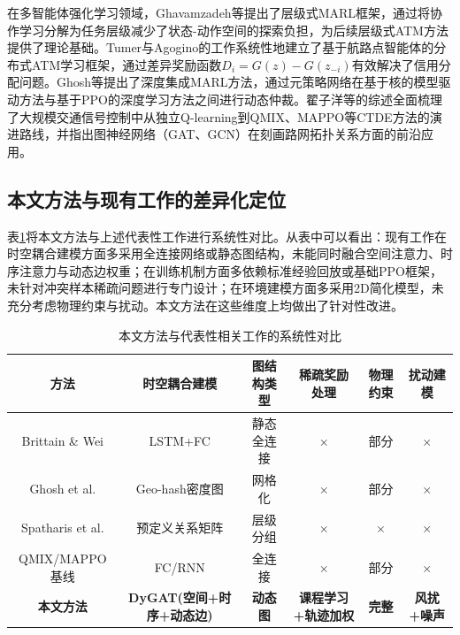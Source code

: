 \documentclass[12pt,a4paper,UTF8]{ctexart}
\begin{document}
在多智能体强化学习领域，Ghavamzadeh等提出了层级式MARL框架\cite{ref12}，通过将协作学习分解为任务层级减少了状态-动作空间的探索负担，为后续层级式ATM方法提供了理论基础。Tumer与Agogino的工作\cite{ref2,ref4,ref5}系统性地建立了基于航路点智能体的分布式ATM学习框架，通过差异奖励函数$D_i = G(z) - G(z_{-i})$有效解决了信用分配问题。Ghosh等提出了深度集成MARL方法\cite{ref9}，通过元策略网络在基于核的模型驱动方法与基于PPO的深度学习方法之间进行动态仲裁。翟子洋等的综述\cite{ref11}全面梳理了大规模交通信号控制中从独立Q-learning到QMIX、MAPPO等CTDE方法的演进路线，并指出图神经网络（GAT、GCN）在刻画路网拓扑关系方面的前沿应用。

\subsection{本文方法与现有工作的差异化定位}

表\ref{tab:related_work}将本文方法与上述代表性工作进行系统性对比。从表中可以看出：现有工作在时空耦合建模方面多采用全连接网络或静态图结构，未能同时融合空间注意力、时序注意力与动态边权重；在训练机制方面多依赖标准经验回放或基础PPO框架，未针对冲突样本稀疏问题进行专门设计；在环境建模方面多采用2D简化模型，未充分考虑物理约束与扰动。本文方法在这些维度上均做出了针对性改进。

\begin{table}[H]
    \centering
    \caption{本文方法与代表性相关工作的系统性对比}
    \label{tab:related_work}
    \begin{tabular}{|c|c|c|c|c|c|}
        \hline
        \textbf{方法} & \textbf{时空耦合建模} & \textbf{图结构类型} & \textbf{稀疏奖励处理} & \textbf{物理约束} & \textbf{扰动建模} \\
        \hline
        Brittain \& Wei \cite{ref3} & LSTM+FC & 静态全连接 & $\times$ & 部分 & $\times$ \\
        \hline
        Ghosh et al. \cite{ref9} & Geo-hash密度图 & 网格化 & $\times$ & 部分 & $\times$ \\
        \hline
        Spatharis et al. \cite{ref7} & 预定义关系矩阵 & 层级分组 & $\times$ & $\times$ & $\times$ \\
        \hline
        QMIX/MAPPO基线 & FC/RNN & 全连接 & $\times$ & 部分 & $\times$ \\
        \hline
        \textbf{本文方法} & \textbf{DyGAT(空间+时序+动态边)} & \textbf{动态图} & \textbf{课程学习+轨迹加权} & \textbf{完整} & \textbf{风扰+噪声} \\
        \hline
    \end{tabular}
\end{table}
\end{document}
